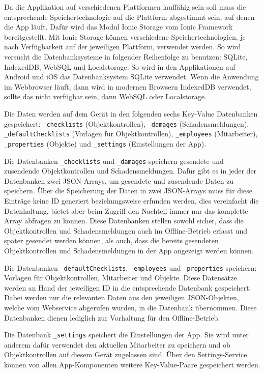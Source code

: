 \documentclass[12pt]{article}
\begin{document}
Da die Applikation auf verschiedenen Plattformen lauffähig sein soll muss die entsprechende Speichertechnologie auf die Plattform abgestimmt sein, auf denen die App läuft. Dafür wird das Modul Ionic Storage vom Ionic Framework bereitgestellt. Mit Ionic Storage können verschiedene Speichertechnologien, je nach Verfügbarkeit auf der jeweiligen Plattform, verwendet werden. So wird versucht die Datenbanksysteme in folgender Reihenfolge zu benutzen: SQLite, IndexedDB, WebSQL und Localstorage. So wird in den Applikationen auf Android und iOS das Datenbanksystem SQLite verwendet. Wenn die Anwendung im Webbrowser läuft, dann wird in modernen Browsern IndexedDB verwendet, sollte das nicht verfügbar sein, dann WebSQL oder Localstorage. 

Die Daten werden auf dem Gerät in den folgenden sechs Key-Value Datenbanken gespeichert: \texttt{\_checklists} (Objektkontrollen), \texttt{\_damages} (Schadensmeldungen), \texttt{\_defaultChecklists} (Vorlagen für Objektkontrollen), \texttt{\_employees} (Mitarbeiter), \texttt{\_properties} (Objekte) und \texttt{\_settings} (Einstellungen der App).

Die Datenbanken \texttt{\_checklists} und \texttt{\_damages} speichern gesendete und zusendende Objektkontrollen und Schadensmeldungen. Dafür gibt es in jeder der Datenbanken zwei JSON-Arrays, um gesendete und zusendende Daten zu speichern. Über die Speicherung der Daten in zwei JSON-Arrays muss für diese Einträge keine ID generiert beziehungsweise erfunden werden, dies vereinfacht die Datenhaltung, bietet aber beim Zugriff den Nachteil immer nur das komplette Array abfragen zu können. Diese Datenbanken stellen sowohl sicher, dass die Objektkontrollen und Schadensmeldungen auch im Offline-Betrieb erfasst und später gesendet werden können, als auch, dass die bereits gesendeten Objektkontrollen und Schadensmeldungen in der App angezeigt werden können.

Die Datenbanken \texttt{\_defaultChecklists}, \texttt{\_employees} und \texttt{\_properties} speichern: Vorlagen für Objektkontrollen, Mitarbeiter und Objekte. Diese Datensätze werden an Hand der jeweiligen ID in die entsprechende Datenbank gespeichert. Dabei werden nur die relevanten Daten aus den jeweiligen JSON-Objekten, welche vom Webservice abgerufen wurden, in die Datenbank übernommen. Diese Datenbanken dienen lediglich zur Vorhaltung für den Offline-Betrieb.

Die Datenbank \texttt{\_settings} speichert die Einstellungen der App. Sie wird unter anderem dafür verwendet den aktuellen Mitarbeiter zu speichern und ob Objektkontrollen auf diesem Gerät zugelassen sind. Über den Settings-Service können von allen App-Komponenten weitere Key-Value-Paare gespeichert werden.
\end{document}
